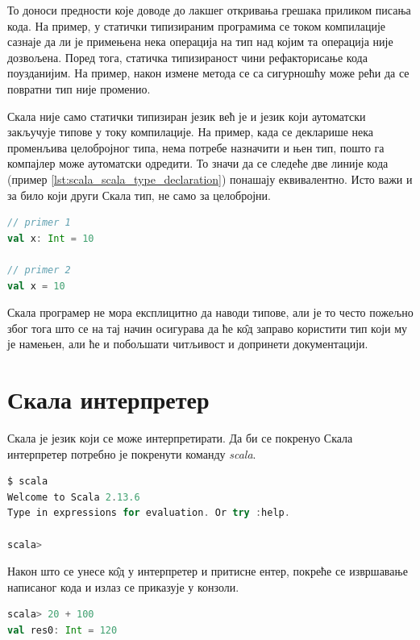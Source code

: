 \documentclass[12pt,oneside]{memoir}
\begin{document}
То доноси предности које доводе до лакшег откривања грешака приликом писања кода. На пример, у статички типизираним програмима се током компилације сазнаје да ли је примењена нека операција на тип над којим та операција није дозвољена. Поред тога, статичка типизираност чини рефакторисање кода поузданијим. На пример, након измене метода се са сигурношћу може рећи да се повратни тип није променио. \cite{scala_prog}

Скала није само статички типизиран језик већ је и језик који аутоматски закључује типове у току компилације. На пример, када се декларише нека променљива целобројног типа, нема потребе назначити и њен тип, пошто га компајлер може аутоматски одредити. То значи да се следеће две линије кода (пример \ref{lst:scala_scala_type_declaration}) понашају еквивалентно. Исто важи и за било који други Скала тип, не само за целобројни.

\begin{lstlisting}[caption={Декларација типова}, language=Scala, label={lst:scala_scala_type_declaration}]
// primer 1
val x: Int = 10

// primer 2
val x = 10
\end{lstlisting}

Скала програмер не мора експлицитно да наводи типове, али је то  често пожељно због тога што се на тај начин осигурава да ће к\^{о}д заправо користити тип који му је намењен, али ће и побољшати читљивост и допринети документацији. \cite{scala_prog}

\section{Скала интерпретер}
\label{sec:scala_interpr}

Скала је језик који се може интерпретирати. Да би се покренуо Скала интерпретер потребно је покренути команду \textit{scala}.

\begin{lstlisting}[language=Scala, caption={Скала интерпретер}, label={lst:scala_scala_interpreter_example}]
$ scala
Welcome to Scala 2.13.6
Type in expressions for evaluation. Or try :help.

scala>
\end{lstlisting}

Након што се унесе к\^{о}д у интерпретер и притисне ентер, покреће се извршавање написаног кода и излаз се приказује у конзоли.

\begin{lstlisting}[language=Scala, caption={Пример кода у интерпретеру}, label={lst:scala_interpreter_code_example}]
scala> 20 + 100
val res0: Int = 120
\end{lstlisting}
\end{document}
